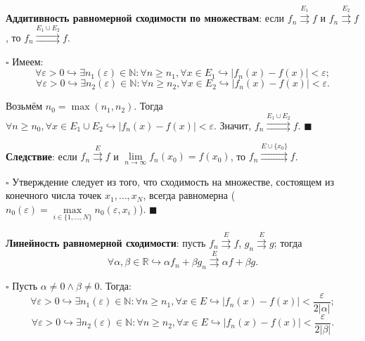 \documentclass[12pt, a4paper, reqno]{article}
\begin{document}
    \textbf{Аддитивность равномерной сходимости по множествам}: если $f_n \overset{E_1}{\rightrightarrows} f$
    и $f_n \overset{E_2}{\rightrightarrows} f$, то $f_n \overset{E_1 \cup E_2}{\rightrightarrows} f$.

    $\square$
    Имеем:
    \begin{equation*}
        \forall \varepsilon > 0 \hookrightarrow \exists n_1(\varepsilon) \in \mathbb{N}: \forall n \geq n_1,
        \forall x \in E_1 \hookrightarrow |f_n(x) - f(x)| < \varepsilon;
    \end{equation*}
    \begin{equation*}
        \forall \varepsilon > 0 \hookrightarrow \exists n_2(\varepsilon) \in \mathbb{N}: \forall n \geq n_2,
        \forall x \in E_2 \hookrightarrow |f_n(x) - f(x)| < \varepsilon.
    \end{equation*}

    Возьмём $n_0 = \max(n_1, n_2)$. Тогда $\forall n \geq n_0, \forall x \in E_1 \cup E_2 \hookrightarrow
    |f_n(x) - f(x)| < \varepsilon$. Значит, $f_n \overset{E_1 \cup E_2}{\rightrightarrows} f$.
    $\blacksquare$

    \textbf{Следствие}: если $f_n \overset{E}{\rightrightarrows} f$ и $\lim\limits_{n \to \infty}
    f_n(x_0) = f(x_0)$, то $f_n \overset{E \cup \{x_0\}}{\rightrightarrows} f$.

    $\square$
    Утверждение следует из того, что сходимость на множестве, состоящем из конечного числа точек
    $x_1, \ldots, x_N$, всегда равномерна
    ($n_0(\varepsilon) = \max\limits_{i \in \{1, \ldots, N\}} n_0(\varepsilon, x_i)$).
    $\blacksquare$

    \textbf{Линейность равномерной сходимости}: пусть $f_n \overset{E}{\rightrightarrows} f$,
    $g_n \overset{E}{\rightrightarrows} g$; тогда
    \begin{equation*}
        \forall \alpha, \beta \in \mathbb{R} \hookrightarrow
        \alpha f_n + \beta g_n \overset{E}{\rightrightarrows} \alpha f + \beta g.
    \end{equation*}

    $\square$
    Пусть $\alpha \neq 0 \wedge \beta \neq 0$. Тогда:
    \begin{equation*}
        \forall \varepsilon > 0 \hookrightarrow \exists n_1(\varepsilon) \in \mathbb{N}: \forall n \geq n_1,
        \forall x \in E \hookrightarrow |f_n(x) - f(x)| < \frac{\varepsilon}{2|\alpha|};
    \end{equation*}
    \begin{equation*}
        \forall \varepsilon > 0 \hookrightarrow \exists n_2(\varepsilon) \in \mathbb{N}: \forall n \geq n_2,
        \forall x \in E \hookrightarrow |f_n(x) - f(x)| < \frac{\varepsilon}{2|\beta|}.
    \end{equation*}
\end{document}
